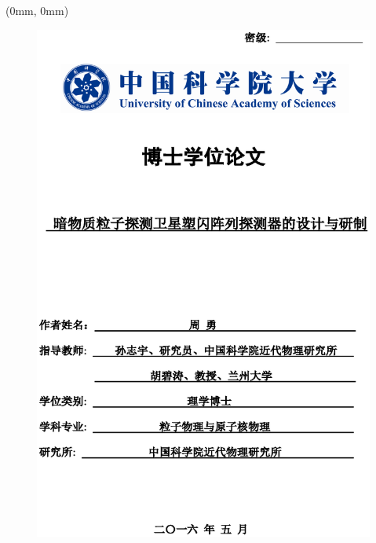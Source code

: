 \begin{textblock*}{210mm}(0mm, 0mm)
\begin{figure}[!hbt]
	\centering
	\includegraphics[width=210mm]{fig/ucas_cover_cn.eps}
\end{figure}
\end{textblock*}
